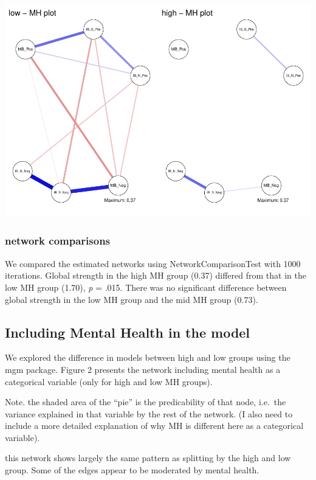 \documentclass[man,floatsintext]{apa6}
\begin{document}
\includegraphics{script_files/figure-latex/plotting_highlow-1.pdf}

\hypertarget{network-comparisons}{%
\subsubsection{network comparisons}\label{network-comparisons}}

We compared the estimated networks using NetworkComparisonTest with 1000 iterations. Global strength in the high MH group (0.37) differed from that in the low MH group (1.70), \emph{p} = .015. There was no significant difference between global strength in the low MH group and the mid MH group (0.73).

\newpage

\hypertarget{including-mental-health-in-the-model}{%
\subsection{Including Mental Health in the model}\label{including-mental-health-in-the-model}}

We explored the difference in models between high and low groups using the mgm package. Figure 2 presents the network including mental health as a categorical variable (only for high and low MH groups).

Note. the shaded area of the \enquote{pie} is the predicability of that node, i.e.~the variance explained in that variable by the rest of the network. (I also need to include a more detailed explanation of why MH is different here as a categorical variable).

this network shows largely the same pattern as splitting by the high and low group. Some of the edges appear to be moderated by mental health.
\end{document}
